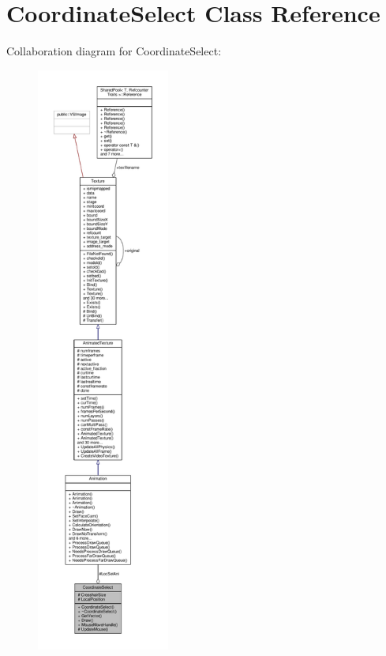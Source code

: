 \hypertarget{classCoordinateSelect}{}\section{Coordinate\+Select Class Reference}
\label{classCoordinateSelect}


Collaboration diagram for Coordinate\+Select\+:
\nopagebreak
\begin{figure}[H]
\begin{center}
\leavevmode
\includegraphics[height=550pt]{d9/d68/classCoordinateSelect__coll__graph}
\end{center}
\end{figure}
